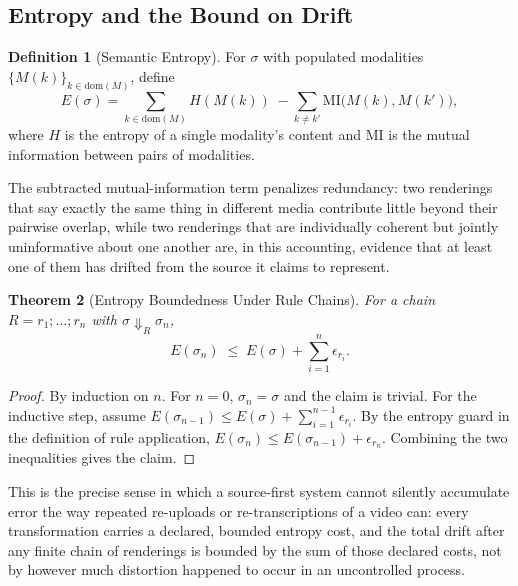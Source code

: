 \documentclass[11pt]{article}
\newtheorem{theorem}{Theorem}[section]
\theoremstyle{definition}
\newtheorem{definition}[theorem]{Definition}
\begin{document}
\subsection{Entropy and the Bound on Drift}

\begin{definition}[Semantic Entropy]
\label{def:entropy}
For $\sigma$ with populated modalities $\{M(k)\}_{k \in \mathrm{dom}(M)}$, define
\[
E(\sigma) = \sum_{k \in \mathrm{dom}(M)} H(M(k)) \; - \sum_{k \neq k'} \mathrm{MI}\bigl(M(k), M(k')\bigr),
\]
where $H$ is the entropy of a single modality's content and $\mathrm{MI}$ is the mutual information between pairs of modalities.
\end{definition}

The subtracted mutual-information term penalizes redundancy: two renderings that say exactly the same thing in different media contribute little beyond their pairwise overlap, while two renderings that are individually coherent but jointly uninformative about one another are, in this accounting, evidence that at least one of them has drifted from the source it claims to represent.

\begin{theorem}[Entropy Boundedness Under Rule Chains]
\label{thm:entropy-bound}
For a chain $R = r_1;\dots;r_n$ with $\sigma \Downarrow_R \sigma_n$,
\[
E(\sigma_n) \;\leq\; E(\sigma) + \sum_{i=1}^n \epsilon_{r_i}.
\]
\end{theorem}

\begin{proof}
By induction on $n$. For $n=0$, $\sigma_n = \sigma$ and the claim is trivial. For the inductive step, assume $E(\sigma_{n-1}) \leq E(\sigma) + \sum_{i=1}^{n-1}\epsilon_{r_i}$. By the entropy guard in the definition of rule application, $E(\sigma_n) \leq E(\sigma_{n-1}) + \epsilon_{r_n}$. Combining the two inequalities gives the claim.
\end{proof}

This is the precise sense in which a source-first system cannot silently accumulate error the way repeated re-uploads or re-transcriptions of a video can: every transformation carries a declared, bounded entropy cost, and the total drift after any finite chain of renderings is bounded by the sum of those declared costs, not by however much distortion happened to occur in an uncontrolled process.
\end{document}
